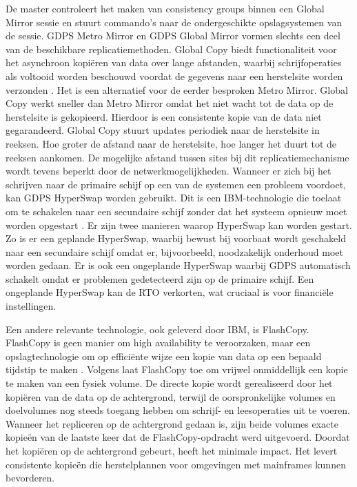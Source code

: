 De master controleert het maken van consistency groups binnen een Global Mirror sessie en stuurt commando's naar de ondergeschikte opslagsystemen van de sessie. 
GDPS Metro Mirror en GDPS Global Mirror vormen slechts een deel van de beschikbare replicatiemethoden.
Global Copy biedt functionaliteit voor het asynchroon kopiëren van data over lange afstanden, waarbij schrijfoperaties als voltooid worden beschouwd voordat de gegevens naar een herstelsite worden verzonden \autocite{ibm_2023_ibm_global_copy}.
Het is een alternatief voor de eerder besproken Metro Mirror.
Global Copy werkt sneller dan Metro Mirror omdat het niet wacht tot de data op de herstelsite is gekopieerd.
Hierdoor is een consistente kopie van de data niet gegarandeerd.
Global Copy stuurt updates periodiek naar de herstelsite in reeksen.
Hoe groter de afstand naar de herstelsite, hoe langer het duurt tot de reeksen aankomen.
De mogelijke afstand tussen sites bij dit replicatiemechanisme wordt tevens beperkt door de netwerkmogelijkheden.
Wanneer er zich bij het schrijven naar de primaire schijf op een van de systemen een probleem voordoet, kan GDPS HyperSwap worden gebruikt.
Dit is een IBM-technologie die toelaat om te schakelen naar een secundaire schijf zonder dat het systeem opnieuw moet worden opgestart \autocite{gomes_2025_redbooks}.
Er zijn twee manieren waarop HyperSwap kan worden gestart.
Zo is er een geplande HyperSwap, waarbij bewust bij voorbaat wordt geschakeld naar een secundaire schijf omdat er, bijvoorbeeld, noodzakelijk onderhoud moet worden gedaan.
Er is ook een ongeplande HyperSwap waarbij GDPS automatisch schakelt omdat er problemen gedetecteerd zijn op de primaire schijf.
Een ongeplande HyperSwap kan de RTO verkorten, wat cruciaal is voor financiële instellingen.

Een andere relevante technologie, ook geleverd door IBM, is FlashCopy.
FlashCopy is geen manier om high availability te veroorzaken, maar een opslagtechnologie om op efficiënte wijze een kopie van data op een bepaald tijdstip te maken \autocite{ibm_2017_ibm_flash_copy}.
Volgens \textcite{ibm_2025_powerha_overview_of_global_mirror} laat FlashCopy toe om vrijwel onmiddellijk een kopie te maken van een fysiek volume.
De directe kopie wordt gerealiseerd door het kopiëren van de data op de achtergrond, terwijl de oorspronkelijke volumes en doelvolumes nog steeds toegang hebben om schrijf- en leesoperaties uit te voeren.
Wanneer het repliceren op de achtergrond gedaan is, zijn beide volumes exacte kopieën van de laatste keer dat de FlashCopy-opdracht werd uitgevoerd.
Doordat het kopiëren op de achtergrond gebeurt, heeft het minimale impact.
Het levert consistente kopieën die herstelplannen voor omgevingen met mainframes kunnen bevorderen.


